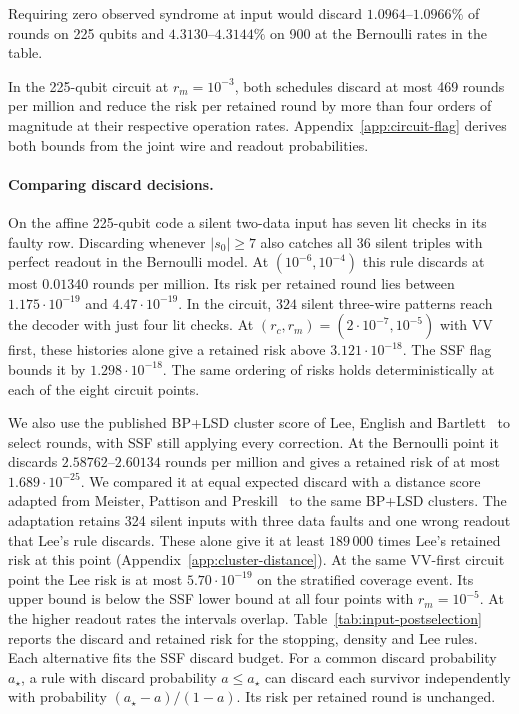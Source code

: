\documentclass[10pt,twocolumn]{article}
\theoremstyle{definition}
\begin{document}
Requiring zero observed syndrome at input would discard $1.0964$--$1.0966\%$ of rounds on 225
qubits and $4.3130$--$4.3144\%$ on 900 at the Bernoulli rates in the table.

In the 225-qubit circuit at $r_m=10^{-3}$, both schedules discard
at most 469 rounds per million and reduce the risk per retained
round by more than four orders of magnitude at their respective
operation rates. Appendix~\ref{app:circuit-flag} derives both bounds
from the joint wire and readout probabilities.

\paragraph{Comparing discard decisions.}
On the affine 225-qubit code a silent two-data input has seven lit
checks in its faulty row. Discarding whenever $|s_0|\ge7$ also catches
all $36$ silent triples with perfect readout in the Bernoulli model.
At $(10^{-6},10^{-4})$ this rule discards at most $0.01340$ rounds per
million. Its risk per retained round lies between $1.175\cdot10^{-19}$
and $4.47\cdot10^{-19}$. In the circuit,
$324$ silent three-wire patterns reach the decoder with just four
lit checks. At $(r_c,r_m)=(2\cdot10^{-7},10^{-5})$ with VV first,
these histories alone give a retained risk above $3.121\cdot10^{-18}$.
The SSF flag bounds it by $1.298\cdot10^{-18}$. The same ordering of
risks holds deterministically at each of the eight circuit points.

We also use the published BP+LSD cluster score of Lee, English and
Bartlett~\cite{LEB26} to select rounds, with SSF still applying
every correction. At the Bernoulli point it discards
$2.58762$--$2.60134$ rounds per million and gives a retained risk
of at most $1.689\cdot10^{-25}$. We compared it at equal expected
discard with a distance score adapted from Meister, Pattison and
Preskill~\cite[Alg.~2]{MPP24} to the same BP+LSD clusters. The
adaptation retains 324 silent inputs with three data faults and one
wrong readout that Lee's rule discards. These alone give it at least
$189\,000$ times Lee's retained risk at this point
(Appendix~\ref{app:cluster-distance}).
At the same VV-first circuit point the Lee risk is at
most $5.70\cdot10^{-19}$ on the stratified coverage event. Its upper
bound is below the SSF lower bound at all four points with
$r_m=10^{-5}$. At the higher readout rates the intervals overlap.
Table~\ref{tab:input-postselection} reports the discard and retained
risk for the stopping, density and Lee rules. Each alternative fits
the SSF discard budget.
For a common discard probability $a_\star$, a rule with discard
probability $a\le a_\star$ can discard each survivor independently
with probability $(a_\star-a)/(1-a)$. Its risk per retained round is
unchanged.
\end{document}
